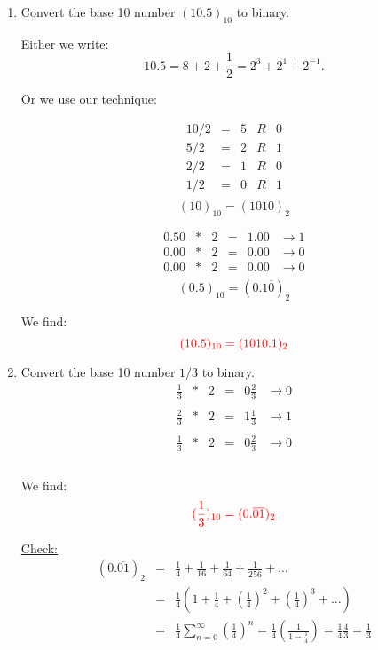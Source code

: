 \documentclass[pdftex,11pt]{article}
\begin{document}
\begin{enumerate}
\item \color{red}Convert the base 10 number $(10.5)_{10}$ to binary.\color{black}

Either we write:
$$ 10.5 = 8 + 2 + \frac{1}{2} = 2^3 + 2^1 + 2^{-1}.$$

Or we use our technique:\\
\begin{minipage}{.4\textwidth}
$$
\begin{array}{rcrcc}
10/2  & = &    5 & R & 0 \\
5/2   & = &    2 & R & 1 \\
2/2  & = &     1 & R & 0 \\
1/2  & = &     0 & R & 1 \\
\end{array}
$$
$$ (10)_{10} = (1010)_2$$
\end{minipage}
\begin{minipage}{.4\textwidth}
$$
\begin{array}{rcrccc}
0.50& *& 2   & = & 1.00 &    \rightarrow     1  \\
0.00& *& 2   & = & 0.00 &    \rightarrow     0  \\
\hline
0.00 & *& 2   & = & 0.00 &    \rightarrow     0  \\
\end{array}
$$
$$ (0.5)_{10} = (0.1\overline{0})_2$$
\end{minipage}

We find:
$$\color{red} (10.5)_{10} = (1010.1)_2 $$

\item 

\color{red}Convert the base 10 number $1/3$ to binary.\color{black}
$$
\begin{array}{rcrccc}
\frac{1}{3}& *& 2   & = & 0\frac{2}{3}&    \rightarrow     0  \\\\
\frac{2}{3}& *& 2   & = & 1\frac{1}{3}&    \rightarrow     1  \\\\
\hline
\frac{1}{3}& *& 2   & = & 0\frac{2}{3}&    \rightarrow     0  \\\\
\end{array}
$$

We find:
$$\color{red} (\frac{1}{3})_{10} = (0.\overline{01})_2 $$

\underline{Check:}
\begin{eqnarray}
(0.\overline{01})_{2} 
\nonumber & = & \frac{1}{4}+ \frac{1}{16}+ \frac{1}{64}+ \frac{1}{256}+\ldots\\
\nonumber & = & \frac{1}{4}\left(1 + \frac{1}{4}+ \left(\frac{1}{4}\right)^2+ \left(\frac{1}{4}\right)^3+\ldots \right)\\
\nonumber & = & \frac{1}{4}\sum_{n=0}^\infty\left(\frac{1}{4}\right)^n
 = \frac{1}{4}\left(\frac{1}{1-\frac{1}{4}}\right)
 = \frac{1}{4}\frac{4}{3}
 = \frac{1}{3}
\end{eqnarray}


\end{enumerate}
\end{document}
